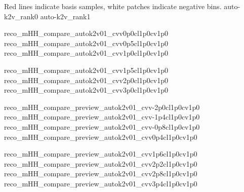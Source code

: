 {Red lines indicate basis samples, white patches indicate negative bins.}
{auto-k2v_rank0}
{auto-k2v_rank1}

{reco_mHH_compare_autok2v01_cvv0p0cl1p0cv1p0}
{reco_mHH_compare_autok2v01_cvv0p5cl1p0cv1p0}
{reco_mHH_compare_autok2v01_cvv1p0cl1p0cv1p0}

{reco_mHH_compare_autok2v01_cvv1p5cl1p0cv1p0}
{reco_mHH_compare_autok2v01_cvv2p0cl1p0cv1p0}
{reco_mHH_compare_autok2v01_cvv3p0cl1p0cv1p0}

{reco_mHH_compare_preview_autok2v01_cvv-2p0cl1p0cv1p0}
{reco_mHH_compare_preview_autok2v01_cvv-1p4cl1p0cv1p0}
{reco_mHH_compare_preview_autok2v01_cvv-0p8cl1p0cv1p0}
{reco_mHH_compare_preview_autok2v01_cvv0p4cl1p0cv1p0}

{reco_mHH_compare_preview_autok2v01_cvv1p6cl1p0cv1p0}
{reco_mHH_compare_preview_autok2v01_cvv2p2cl1p0cv1p0}
{reco_mHH_compare_preview_autok2v01_cvv2p8cl1p0cv1p0}
{reco_mHH_compare_preview_autok2v01_cvv3p4cl1p0cv1p0}

